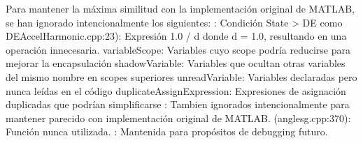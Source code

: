 \markdownRendererInterblockSeparator
{}Para mantener la máxima similitud con la implementación original de MATLAB, se han ignorado intencionalmente los siguientes:\markdownRendererInterblockSeparator
{}: Condición State\markdownRendererUnderscore{} > DE como DEAccelHarmonic.cpp:23): Expresión 1.0 / d donde d = 1.0, resultando en una operación innecesaria. variableScope: Variables cuyo scope podría reducirse para mejorar la encapsulación shadowVariable: Variables que ocultan otras variables del mismo nombre en scopes superiores unreadVariable: Variables declaradas pero nunca leídas en el código duplicateAssignExpression: Expresiones de asignación duplicadas que podrían simplificarse\markdownRendererInterblockSeparator
{}: Tambien ignorados intencionalmente para mantener parecido con implementación original de MATLAB.\markdownRendererInterblockSeparator
{}
\markdownRendererSectionEnd \markdownRendererSectionBegin
{}\markdownRendererInterblockSeparator
{}
\markdownRendererSectionEnd \markdownRendererSectionBegin
{}\markdownRendererInterblockSeparator
{}\markdownRendererUlBeginTight
\markdownRendererUlItem {} (anglesg.cpp:370): Función  nunca utilizada.\markdownRendererUlItemEnd 
\markdownRendererUlEndTight \markdownRendererInterblockSeparator
{}: Mantenida para propósitos de debugging futuro.
\markdownRendererSectionEnd 
\markdownRendererSectionEnd 
\markdownRendererSectionEnd 
\markdownRendererSectionEnd \markdownRendererDocumentEnd